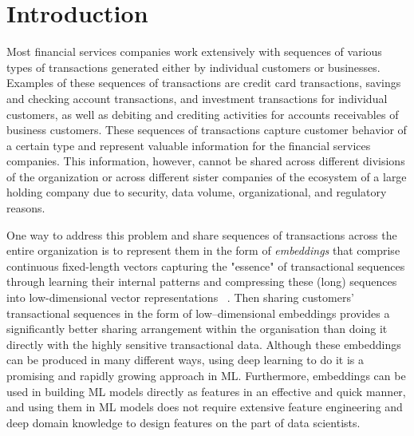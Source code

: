 \documentclass[sigconf]{acmart}
\begin{document}


\maketitle

\section{Introduction} \label{sec-intro}

Most financial services companies work extensively with sequences of various types of transactions generated either by individual customers or businesses. Examples of these sequences of transactions are credit card transactions, savings and checking account transactions, and investment transactions for individual customers, as well as debiting and crediting activities for accounts receivables of business customers. These sequences of transactions capture customer behavior of a certain type and represent valuable information for the financial services companies. This information, however, cannot be shared across different divisions of the organization or across different sister companies of the ecosystem of a large holding company due to security, data volume, organizational, and regulatory reasons. 

One way to address this problem and share sequences of transactions across the entire organization is to represent them in the form of \emph{embeddings} that comprise continuous fixed-length vectors capturing the "essence" of transactional sequences through learning their internal patterns and compressing these (long) sequences into low-dimensional vector representations ~\citep{Mikolov2013EfficientEO, Peters2018DeepCW, Devlin2019BERTPO, Doersch2015UnsupervisedVR, Oord2018RepresentationLW}.
Then sharing customers' transactional sequences in the form of low--dimensional embeddings provides a significantly better sharing arrangement within the organisation than doing it directly with the highly sensitive transactional data. Although these embeddings can be produced in many different ways, using deep learning to do it is a promising and rapidly growing approach in ML. 
Furthermore, embeddings can be used in building ML models directly as features in an effective and quick manner, and using them in ML models does not require extensive feature engineering and deep domain knowledge to design features on the part of data scientists. 
\end{document}
